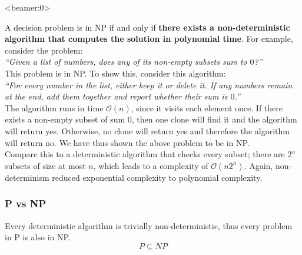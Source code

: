 \documentclass[handout, 12pt]{beamer}
\newcommand{\bigo}[1]{\mathcal{O}\mathopen{}\left(#1\right)\mathclose{}}
\begin{document}
\begin{frame}<beamer:0>

\footnotesize
A decision problem is in NP if and only if \textbf{there exists a non-deterministic algorithm that computes the solution in polynomial time}. For example, consider the problem:
\\[0.6em]
\textit{``Given a list of numbers, does any of its non-empty subsets sum to $0$?''}
\\[0.6em]
This problem is in NP. To show this, consider this algorithm:
\\[0.6em]
\textit{``For every number in the list, either keep it or delete it. If any numbers remain at the end, add them together and report whether their sum is $0$.''}
\\[0.6em]
The algorithm runs in time $\bigo{n}$, since it visits each element once. If there exists a non-empty subset of sum $0$, then one clone will find it and the algorithm will return yes. Otherwise, no clone will return yes and therefore the algorithm will return no. We have thus shown the above problem to be in NP.
\\[0.6em]
Compare this to a deterministic algorithm that checks every subset; there are $2^n$ subsets of size at most $n$, which leads to a complexity of $\bigo{n2^n}$. Again, non-determinism reduced exponential complexity to polynomial complexity. 

\end{frame}

\begin{frame}

\frametitle{P vs NP}

Every deterministic algorithm is trivially non-deterministic, thus every problem in P is also in NP.
\begin{equation*}
P\subseteq NP
\end{equation*}

\pause

\centering
{}

\end{frame}
\end{document}
